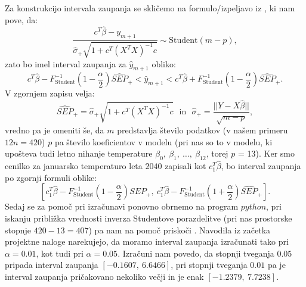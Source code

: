 \documentclass{article}
\begin{document}
Za konstrukcijo intervala zaupanja se skličemo na formulo/izpeljavo iz \cite{lin_reg}, ki nam pove, da:
$$
    \frac{c^T\hat{\beta} - y_{m+1}}{\hat{\sigma}_{+}\sqrt{1 + c^T(X^TX)^{-1}c}} \sim \text{Student}(m-p), 
$$
zato bo imel interval zaupanja za $\hat{y}_{m+1}$ obliko:
$$
    c^T\hat{\beta} - F^{-1}_{\text{Student}}\left(1 - \frac{\alpha}{2}\right)\widehat{SEP}_{+} < \hat{y}_{m+1} < c^T\hat{\beta} + F^{-1}_{\text{Student}}\left(1 - \frac{\alpha}{2}\right)\widehat{SEP}_{+}.
$$
V zgornjem zapisu velja:
$$
\widehat{SEP}_{+}  = \hat{\sigma}_{+}\sqrt{1 + c^T(X^TX)^{-1}c}~~~\text{in}~~~\hat{\sigma}_{+} = \frac{||Y - X\hat{\beta}||}{\sqrt{m - p}},
$$
vredno pa je omeniti še, da $m$ predstavlja število podatkov (v našem primeru $12n = 420$) $p$ pa število koeficientov v modelu (pri nas so to v modelu, ki upošteva tudi letno nihanje temperature $\beta_0,~\beta_1,~\dots,~\beta_{12}$, torej $p$ = 13).
\newline
Ker smo cenilko za januarsko temperaturo leta $2040$ zapisali kot $c_1^T \hat{\beta}$, bo interval zaupanja po zgornji formuli oblike:
$$
\left[c_1^T\hat{\beta} - F^{-1}_{\text{Student}}\left(1 - \frac{\alpha}{2}\right)\widehat{SEP}_{+} ,~c_1^T\hat{\beta} - F^{-1}_{\text{Student}}\left(1 + \frac{\alpha}{2}\right)\widehat{SEP}_{+} \right].
$$
Sedaj se za pomoč pri izračunavi ponovno obrnemo na program $python$, pri iskanju približka vrednosti inverza Studentove porazdelitve (pri nas prostorske stopnje $420 - 13 = 407$) pa nam na pomoč priskoči \cite{student}. 
Navodila iz začetka projektne naloge narekujejo, da moramo interval zaupanja izračunati tako pri $\alpha = 0.01$, kot tudi pri $\alpha = 0.05$. 
Izračuni nam povedo, da stopnji tveganja $0.05$ pripada interval zaupanja $[-0.1607,~6.6466]$, pri stopnji tveganja $0.01$ pa je interval zaupanja pričakovano nekoliko večji in je enak $[-1.2379,~7.7238]$.
\end{document}
